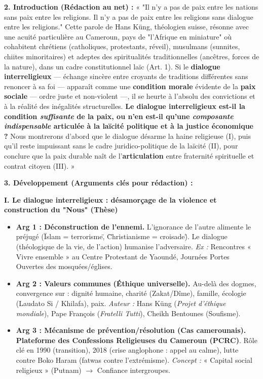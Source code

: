 \documentclass[11pt]{article}
\begin{document}
\begin{exoresolu}
\textbf{2. Introduction (Rédaction au net) :}
« "Il n'y a pas de paix entre les nations sans paix entre les religions. Il n'y a pas de paix entre les religions sans dialogue entre les religions." Cette parole de Hans Küng, théologien suisse, résonne avec une acuité particulière au Cameroun, pays de "l'Afrique en miniature" où cohabitent chrétiens (catholiques, protestants, réveil), musulmans (sunnites, chiites minoritaires) et adeptes des spiritualités traditionnelles (ancêtres, forces de la nature), dans un cadre constitutionnel laïc (Art. 1). Si le \textbf{dialogue interreligieux} — échange sincère entre croyants de traditions différentes sans renoncer à sa foi — apparaît comme une \textbf{condition morale} évidente de la \textbf{paix sociale} — ordre juste et non-violent —, il se heurte à l'absolu des convictions et à la réalité des inégalités structurelles. \textbf{Le dialogue interreligieux est-il la condition \emph{suffisante} de la paix, ou n'en est-il qu'une \emph{composante indispensable} articulée à la laïcité politique et à la justice économique ?} Nous montrerons d'abord que le dialogue désarme la haine religieuse (I), puis qu'il reste impuissant sans le cadre juridico-politique de la laïcité (II), pour conclure que la paix durable naît de l'\textbf{articulation} entre fraternité spirituelle et contrat citoyen (III). »

\textbf{3. Développement (Arguments clés pour rédaction) :}

\textbf{I. Le dialogue interreligieux : désamorçage de la violence et construction du "Nous" (Thèse)}
\begin{itemize}
    \item \textbf{Arg 1 : Déconstruction de l'ennemi.} L'ignorance de l'autre alimente le préjugé (\"Islam = terrorisme\", \"Christianisme = croisade\"). Le dialogue (théologique de la vie, de l'action) humanise l'adversaire. \emph{Ex :} Rencontres « Vivre ensemble » au Centre Protestant de Yaoundé, Journées Portes Ouvertes des mosquées/églises.
    \item \textbf{Arg 2 : Valeurs communes (Éthique universelle).} Au-delà des dogmes, convergence sur : dignité humaine, charité (Zakat/Dîme), famille, écologie (Laudato Si / Khilafa), paix. \emph{Auteur :} Hans Küng (\emph{Projet d'éthique mondiale}), Pape François (\emph{Fratelli Tutti}), Cheikh Bentounes (Soufisme).
    \item \textbf{Arg 3 : Mécanisme de prévention/résolution (Cas camerounais).} \textbf{Plateforme des Confessions Religieuses du Cameroun (PCRC)}. Rôle clé en 1990 (transition), 2018 (crise anglophone : appel au calme), lutte contre Boko Haram (fatwas contre l'extrémisme). \emph{Concept :} « Capital social religieux » (Putnam) $\rightarrow$ Confiance intergroupes.
\end{itemize}


\end{exoresolu}
\end{document}

